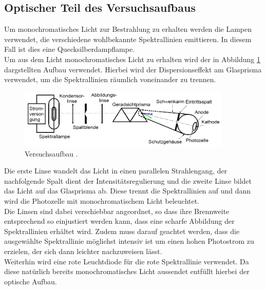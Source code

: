 \subsection{Optischer Teil des Versuchsaufbaus}
Um monochromatisches Licht zur Bestrahlung zu erhalten werden die Lampen verwendet, die verschiedene wohlbekannte Spektrallinien emittieren.
 In diesem Fall ist dies eine Quecksilberdampflampe.\\
Um aus dem Licht monochromatisches Licht zu erhalten wird der in Abbildung \ref{fig:Optisch} dargstellten Aufbau verwendet.
Hierbei wird der Dispersionseffekt am Glasprisma verwendet, um die Spektrallinien räumlich voneinander zu trennen. 
\begin{figure}[H]
    \centering
    \includegraphics[width=0.9\textwidth]{Optisch.png}
    \caption{Versuchsaufbau \cite{1}.}
    \label{fig:Optisch}
\end{figure}
\noindent 
Die erste Linse wandelt das Licht in einen parallelen Strahlengang, der nachfolgende Spalt dient der Intensitätsregulierung und
 die zweite Linse bildet das Licht auf das Glasprisma ab. 
 Diese trennt die Spektrallinien auf und dann wird die Photozelle mit monochromatischem Licht beleuchtet.\\
Die Linsen sind dabei verschiebbar angeordnet, so dass   ihre Brennweite  entsprechend so einjustiert werden kann, 
dass eine scharfe Abbildung der Spektrallinien erhältet wird. Zudem muss darauf geachtet werden, 
dass die ausgewählte Spektrallinie möglichst intensiv ist um einen hohen Photostrom zu erzielen, der sich dann leichter nachzuweisen lässt.\\
Weiterhin wird eine rote Leuchtdiode für die rote Spektrallinie verwendet. Da diese natürlich bereits monochromatisches Licht aussendet entfüllt hierbei der optische Aufbau.

